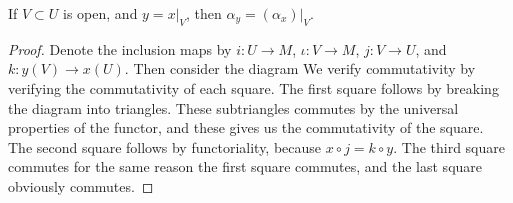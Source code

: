 \begin{lemma}
    If $V \subset U$ is open, and $y = x|_V$, then $\alpha_y = (\alpha_x)|_V$.
\end{lemma}
\begin{proof}
    Denote the inclusion maps by $i: U \to M$, $\iota: V \to M$, $j : V \to U$, and $k : y(V) \to x(U)$. Then consider the diagram
    We verify commutativity by verifying the commutativity of each square. The first square follows by breaking the diagram into triangles.
    These subtriangles commutes by the universal properties of the functor, and these gives us the commutativity of the square. The second square follows by functoriality, because $x \circ j = k \circ y$. The third square commutes for the same reason the first square commutes, and the last square obviously commutes.
\end{proof}

